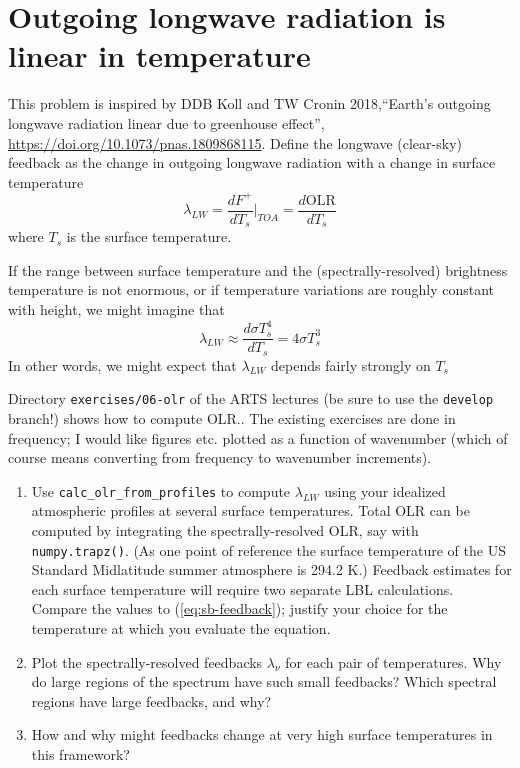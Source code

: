 \documentclass{article}
\begin{document}
\section{Outgoing longwave radiation is linear in temperature}

This problem is inspired by DDB Koll and TW Cronin 2018,``Earth’s outgoing longwave radiation linear due to  greenhouse effect'', \url{https://doi.org/10.1073/pnas.1809868115}. Define the longwave (clear-sky) feedback as the change in outgoing longwave radiation with a change in surface temperature 
\begin{equation}
\lambda_{LW} = \frac{d F^+}{d T_{s}}\bigg|_{TOA} = \frac{d \textrm{OLR}}{d T_{s}}
\end{equation}
where $T_s$ is the surface temperature. 

If the range between surface temperature and the (spectrally-resolved) brightness temperature  is not enormous, or if temperature variations are roughly constant with height, we might  imagine that 
\begin{equation}
\label{eq:sb-feedback}
\lambda_{LW} \approx  \frac{d  \sigma T_s^4}{d T_{s}} = 4 \sigma T_s^3
\end{equation}
In other words, we might expect that $\lambda_{LW}$ depends fairly strongly on $T_s$

Directory {\tt exercises/06-olr} of the ARTS lectures (be sure to use the {\tt develop} branch!) shows how to compute OLR.. The existing exercises are done in frequency; I would like figures etc. plotted as a function of wavenumber (which of course means converting from frequency to wavenumber increments). 

\begin{enumerate}
\item Use {\tt  calc\_olr\_from\_profiles} to compute $\lambda_{LW}$ using your idealized atmospheric profiles at several surface temperatures. Total OLR can be computed by integrating the spectrally-resolved OLR, say with {\tt numpy.trapz()}. (As one point of reference the surface temperature of the US Standard Midlatitude summer atmosphere is 294.2 \si{\kelvin}.) Feedback estimates for each surface temperature will require two separate LBL calculations. Compare the values to  (\ref{eq:sb-feedback}); justify your choice for the temperature at which you evaluate the equation. 
\item Plot the spectrally-resolved feedbacks $\lambda_{\nu}$ for each pair of temperatures. Why do large regions of the spectrum have such small feedbacks? Which spectral regions have large feedbacks, and why?  
\item How and why might feedbacks change at very high surface temperatures in this framework? 
\end{enumerate} 
\end{document}
